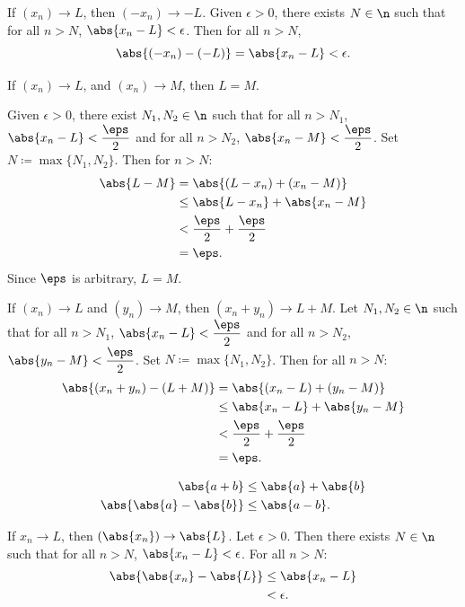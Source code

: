 \begin{proposition}{
    If $(x_n)\to L$, then $(-x_n)\to -L$.
}
    Given $\epsilon > 0$, there exists $N\in\n$ such that for all $n > N$, $\abs{x_n - L} < \epsilon$.
    Then for all $n > N$,
    \[
        \abs{(-x_n) - (-L)} = \abs{x_n - L} < \epsilon.
    \]
\end{proposition}

\begin{proposition}{
    If $(x_n)\to L$, and $(x_n)\to M$, then $L = M$.
}

    Given $\epsilon > 0$, there exist $N_1,N_2\in\n$ such that for all $n > N_1$, $\abs{x_n - L} < \dfrac{\eps}{2}$ and for all $n > N_2$, $\abs{x_n - M} < \dfrac{\eps}{2}$.
    Set $N\coloneqq\max\{N_1,N_2\}$.
    Then for $n >N$:
    \begin{align*}
        \abs{L - M} &= \abs{(L - x_n) + (x_n - M)}\\
        &\leq \abs{L - x_n} + \abs{x_n - M}\\
        &< \dfrac{\eps}{2} + \dfrac{\eps}{2}\\
        &= \eps.
    \end{align*}
    Since $\eps$ is arbitrary, $L = M$.
\end{proposition}

\begin{proposition}{
    If $(x_n)\to L$ and $(y_n)\to M$, then $(x_n + y_n)\to L + M$.
}
    Let $N_1,N_2\in\n$ such that for all $n > N_1$, $\abs{x_n - L} < \dfrac{\eps}{2}$ and for all $n > N_2$, $\abs{y_n - M} < \dfrac{\eps}{2}$.
    Set $N\coloneqq\max\{N_1,N_2\}$.
    Then for all $n>N$:
    \begin{align*}
        \abs{(x_n + y_n) - (L + M)} &= \abs{(x_n - L) + (y_n - M)}\\
        &\leq \abs{x_n - L} + \abs{y_n - M}\\
        &< \dfrac{\eps}{2} + \dfrac{\eps}{2}\\
        &= \eps.
    \end{align*}
\end{proposition}

\begin{definition}
    \begin{align*}
        \abs{a + b} &\leq \abs{a} + \abs{b}\\
        \abs{\abs{a} - \abs{b}} &\leq \abs{a - b}.
    \end{align*}
\end{definition}

\begin{proposition}{
    If $x_n\to L$, then $(\abs{x_n})\to \abs{L}$.
}
    Let $\epsilon > 0$.
    Then there exists $N\in\n$ such that for all $n > N$, $\abs{x_n - L} < \epsilon$.
    For all $n > N$:
    \begin{align*}
        \abs{\abs{x_n} - \abs{L}} &\leq \abs{x_n - L}\\
        &< \epsilon.
    \end{align*}
\end{proposition}
